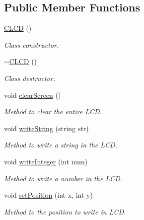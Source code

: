 \subsection*{Public Member Functions}
\begin{DoxyCompactItemize}
\item 
\mbox{\label{class_c_l_c_d_ad695e45a239fa3190dc6192cff4c3a53}} 
\mbox{\hyperlink{class_c_l_c_d_ad695e45a239fa3190dc6192cff4c3a53}{C\+L\+CD}} ()
\begin{DoxyCompactList}\small\item\em Class constructor. \end{DoxyCompactList}\item 
\mbox{\label{class_c_l_c_d_ac958cb7e31c6793cbbf2894b55671ddc}} 
\mbox{\hyperlink{class_c_l_c_d_ac958cb7e31c6793cbbf2894b55671ddc}{$\sim$\+C\+L\+CD}} ()
\begin{DoxyCompactList}\small\item\em Class destructor. \end{DoxyCompactList}\item 
void \mbox{\hyperlink{class_c_l_c_d_aef53edad0951495613b38a0033a7d34c}{clear\+Screen}} ()
\begin{DoxyCompactList}\small\item\em Method to clear the entire L\+CD. \end{DoxyCompactList}\item 
void \mbox{\hyperlink{class_c_l_c_d_a48bc8230b2cef435c7972fd3e9522711}{write\+String}} (string str)
\begin{DoxyCompactList}\small\item\em Method to write a string in the L\+CD. \end{DoxyCompactList}\item 
void \mbox{\hyperlink{class_c_l_c_d_ab5547c17a38247c90db076b8c04baa17}{write\+Integer}} (int num)
\begin{DoxyCompactList}\small\item\em Method to write a number in the L\+CD. \end{DoxyCompactList}\item 
void \mbox{\hyperlink{class_c_l_c_d_af2d845b403b8978261a397cfe50f2fdc}{set\+Position}} (int x, int y)
\begin{DoxyCompactList}\small\item\em Method to the position to write in L\+CD. \end{DoxyCompactList}\end{DoxyCompactItemize}


